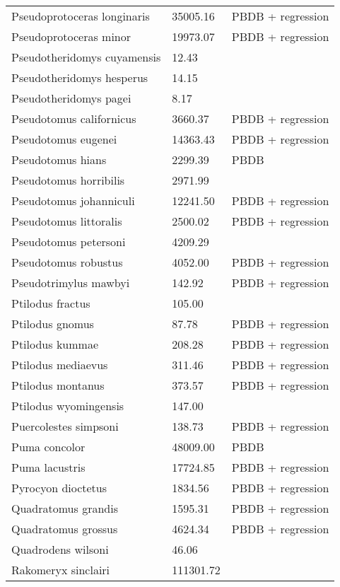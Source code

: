 \documentclass{article}
\begin{document}
\begin{center}
\begin{longtable}{p{} p{} p{} }
  Pseudoprotoceras longinaris & 35005.16 & PBDB + regression \\ 
  Pseudoprotoceras minor & 19973.07 & PBDB + regression \\ 
  Pseudotheridomys cuyamensis & 12.43 & \cite{Tomiya2013} \\ 
  Pseudotheridomys hesperus & 14.15 & \cite{Tomiya2013} \\ 
  Pseudotheridomys pagei & 8.17 & \cite{Tomiya2013} \\ 
  Pseudotomus californicus & 3660.37 & PBDB + regression \\ 
  Pseudotomus eugenei & 14363.43 & PBDB + regression \\ 
  Pseudotomus hians & 2299.39 & PBDB \\ 
  Pseudotomus horribilis & 2971.99 & \cite{Carraway2010} \\ 
  Pseudotomus johanniculi & 12241.50 & PBDB + regression \\ 
  Pseudotomus littoralis & 2500.02 & PBDB + regression \\ 
  Pseudotomus petersoni & 4209.29 & \cite{Carraway2010} \\ 
  Pseudotomus robustus & 4052.00 & PBDB + regression \\ 
  Pseudotrimylus mawbyi & 142.92 & PBDB + regression \\ 
  Ptilodus fractus & 105.00 & \cite{Wilson2012} \\ 
  Ptilodus gnomus & 87.78 & PBDB + regression \\ 
  Ptilodus kummae & 208.28 & PBDB + regression \\ 
  Ptilodus mediaevus & 311.46 & PBDB + regression \\ 
  Ptilodus montanus & 373.57 & PBDB + regression \\ 
  Ptilodus wyomingensis & 147.00 & \cite{Wilson2012} \\ 
  Puercolestes simpsoni & 138.73 & PBDB + regression \\ 
  Puma concolor & 48009.00 & PBDB \\ 
  Puma lacustris & 17724.85 & PBDB + regression \\ 
  Pyrocyon dioctetus & 1834.56 & PBDB + regression \\ 
  Quadratomus grandis & 1595.31 & PBDB + regression \\ 
  Quadratomus grossus & 4624.34 & PBDB + regression \\ 
  Quadrodens wilsoni & 46.06 & \cite{Tomiya2013} \\ 
  Rakomeryx sinclairi & 111301.72 & \cite{Tomiya2013} \\ 

\end{longtable}
\end{center}
\end{document}
